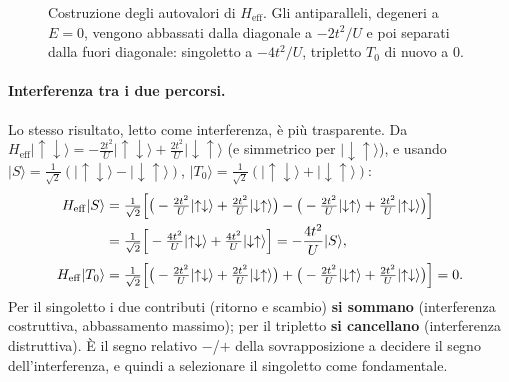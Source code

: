 \documentclass[11pt,a4paper]{article}
\newcommand{\ket}[1]{\lvert #1 \rangle}
\newcommand{\up}{\uparrow}
\newcommand{\dn}{\downarrow}
\newcommand{\Heff}{H_{\mathrm{eff}}}
\theoremstyle{definition}
\theoremstyle{remark}
\begin{document}
\begin{figure}[htbp]
\centering
{}
\caption{Costruzione degli autovalori di $\Heff$. Gli antiparalleli, degeneri a $E=0$, vengono abbassati
dalla diagonale a $-2t^2/U$ e poi separati dalla fuori diagonale: singoletto a $-4t^2/U$, tripletto $T_0$
di nuovo a $0$.}
\label{fig:constr}
\end{figure}

\paragraph{Interferenza tra i due percorsi.} Lo stesso risultato, letto come interferenza, è più
trasparente. Da $\Heff\ket{\up\dn}=-\tfrac{2t^2}{U}\ket{\up\dn}+\tfrac{2t^2}{U}\ket{\dn\up}$ (e simmetrico
per $\ket{\dn\up}$), e usando $\ket{S}=\tfrac1{\sqrt2}(\ket{\up\dn}-\ket{\dn\up})$,
$\ket{T_0}=\tfrac1{\sqrt2}(\ket{\up\dn}+\ket{\dn\up})$:
\begin{align}
\Heff\ket{S}
&=\tfrac1{\sqrt2}\Big[\big(-\tfrac{2t^2}{U}\ket{\up\dn}+\tfrac{2t^2}{U}\ket{\dn\up}\big)
-\big(-\tfrac{2t^2}{U}\ket{\dn\up}+\tfrac{2t^2}{U}\ket{\up\dn}\big)\Big]\notag\\
&=\tfrac1{\sqrt2}\Big[-\tfrac{4t^2}{U}\ket{\up\dn}+\tfrac{4t^2}{U}\ket{\dn\up}\Big]=-\frac{4t^2}{U}\ket{S},
\label{eq:interfS}\\[2pt]
\Heff\ket{T_0}
&=\tfrac1{\sqrt2}\Big[\big(-\tfrac{2t^2}{U}\ket{\up\dn}+\tfrac{2t^2}{U}\ket{\dn\up}\big)
+\big(-\tfrac{2t^2}{U}\ket{\dn\up}+\tfrac{2t^2}{U}\ket{\up\dn}\big)\Big]=0 . \label{eq:interfT}
\end{align}
Per il singoletto i due contributi (ritorno e scambio) \textbf{si sommano} (interferenza costruttiva,
abbassamento massimo); per il tripletto \textbf{si cancellano} (interferenza distruttiva). È il segno
relativo $-$/$+$ della sovrapposizione a decidere il segno dell'interferenza, e quindi a selezionare il
singoletto come fondamentale.
\end{document}
